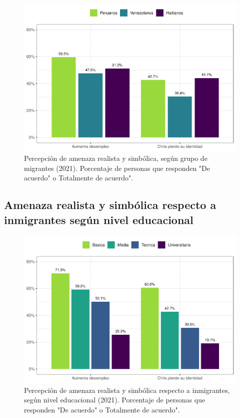 \documentclass[
  12pt,
]{book}
\begin{document}
\begin{figure}

{\centering \includegraphics{reporte-elsoc_files/figure-latex/amen-wave-1} 

}

\caption{Percepción de amenaza realista y simbólica, según grupo de migrantes (2021). Porcentaje de personas que responden "De acuerdo" o Totalmente de acuerdo".}\label{fig:amen-wave}
\end{figure}

\hypertarget{amenaza-realista-y-simbuxf3lica-respecto-a-inmigrantes-seguxfan-nivel-educacional}{%
\subsection{Amenaza realista y simbólica respecto a inmigrantes según nivel educacional}\label{amenaza-realista-y-simbuxf3lica-respecto-a-inmigrantes-seguxfan-nivel-educacional}}

\begin{figure}

{\centering \includegraphics{reporte-elsoc_files/figure-latex/amen-educ-1} 

}

\caption{Percepción de amenaza realista y simbólica respecto a inmigrantes, según nivel educacional (2021). Porcentaje de personas que responden "De acuerdo" o Totalmente de acuerdo".}\label{fig:amen-educ}
\end{figure}
\end{document}
